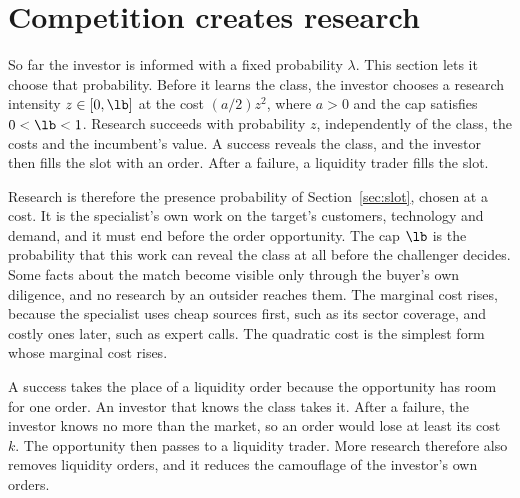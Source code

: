 \section{Competition creates research}\label{sec:research}

So far the investor is informed with a fixed probability \(\lambda\). This section lets it choose that probability.
Before it learns the class, the investor chooses a research intensity \(z\in[0,\lb]\) at the cost \((a/2)z^2\),
where \(a>0\) and the cap satisfies \(0<\lb<1\). Research succeeds with probability \(z\), independently of the
class, the costs and the incumbent's value. A success reveals the class, and the investor then fills the slot with
an order. After a failure, a liquidity trader fills the slot.

Research is therefore the presence probability of Section~\ref{sec:slot}, chosen at a cost. It is the specialist's
own work on the target's customers, technology and demand, and it must end before the order opportunity. The cap
\(\lb\) is the probability that this work can reveal the class at all before the challenger decides. Some facts about
the match become visible only through the buyer's own diligence, and no research by an outsider reaches them. The
marginal cost rises, because the specialist uses cheap sources first, such as its sector coverage, and costly ones
later, such as expert calls. The quadratic cost is the simplest form whose marginal cost rises.

A success takes the place of a liquidity order because the opportunity has room for one order. An investor that
knows the class takes it. After a failure, the investor knows no more than the market, so an order would lose at
least its cost \(k\). The opportunity then passes to a liquidity trader. More research therefore also removes
liquidity orders, and it reduces the camouflage of the investor's own orders.

